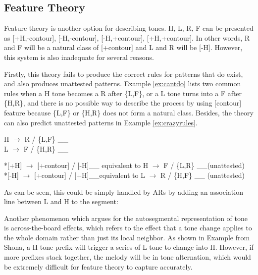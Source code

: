 \subsection{Feature Theory}
Feature theory is another option for describing tones. H, L, R, F can be presented as [+H,-contour], [-H,-contour], [-H,+contour], [+H,+contour]. In other words, R
and F will be a natural class of [+contour] and L and R will be [-H]. However, this system is also inadequate for several reasons. 


Firstly, this theory fails to produce the correct rules for patterns that do exist, and also produces unattested patterns. Example \ref{ex:cantdo} lists two common rules when a H tone becomes a R after \{L,F\}, or a L tone turns into a F after \{H,R\}, and there is no possible way to describe the process by using [contour] feature because \{L,F\} or \{H,R\} does not form a natural class. Besides, the theory can also predict unattested patterns in Example \ref{ex:crazyrules}.

\ex \label{ex:cantdo}
H $\rightarrow$ R / \{L,F\} \_\_\\
L $\rightarrow$ F / \{H,R\} \_\_
\xe 

\ex \label{ex:crazyrules}
*[+H] $\rightarrow$ [+contour] / [-H]\_\_  \hfill equivalent to H $\rightarrow$ F / \{L,R\} \_\_\hfill(unattested)\\
*[-H] $\rightarrow$ [+contour] / [+H]\_\_\hfill   equivalent to L $\rightarrow$ R / \{H,F\} \_\_ \hfill(unattested)
\xe

As can be seen, this could be simply handled by ARs by adding an association line between L and H to the segment:

    

Another phenomenon which argues for the autosegmental representation
of tone is across-the-board effects, which refers to the effect that a tone change applies to the whole domain rather than just its local neighbor. As shown in Example  from Shona, a H tone prefix will trigger a series of L tone to change into H. However, if more prefixes stack together, the melody will be in tone alternation, which would be extremely difficult for feature theory to capture accurately.
